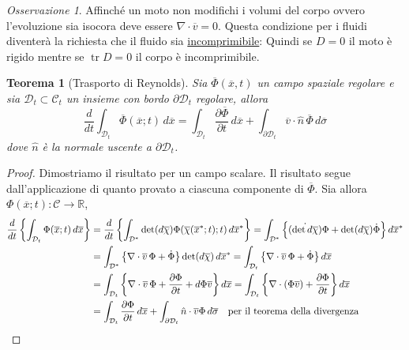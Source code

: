 \documentclass{book}
\theoremstyle{plain}
\newtheorem{teo}{Teorema}[chapter]
\theoremstyle{plain}
\theoremstyle{plain}
\theoremstyle{plain}
\theoremstyle{plain}
\theoremstyle{definition}
\theoremstyle{remark}
\newtheorem*{oss}{Osservazione}
\theoremstyle{definition}
\begin{document}
\begin{oss}
    Affinché un moto non modifichi i volumi del corpo ovvero l'evoluzione sia isocora deve essere $\nabla\cdot\overline{v}=0$. Questa condizione per i fluidi diventerà la richiesta che il fluido sia \underline{incomprimibile}: Quindi se $D=0$ il moto è rigido mentre se $\operatorname{tr}D=0$ il corpo è incomprimibile.
\end{oss}

\begin{teo}[Trasporto di Reynolds]
    Sia $\overline{\Phi}(\overline{x},t)$ un campo spaziale regolare e sia $\mathcal{D}_t\subset\mathcal{C}_t$ un insieme con bordo $\partial\mathcal{D}_t$ regolare, allora
    \begin{displaymath}
        \frac{d}{dt}\int_{\mathcal{D}_t}\overline{\Phi}(\overline{x};t)\,d\overline{x} = \int_{\mathcal{D}_t}\frac{\partial \overline{\Phi}}{\partial t}\,d\overline{x} + \int_{\partial \mathcal{D}_t}\overline{v}\cdot\hat{n}\,\overline{\Phi}\,d\overline{\sigma}
    \end{displaymath}
    dove $\hat{n}$ è la normale uscente a $\partial\mathcal{D}_t$.
\end{teo}

\begin{proof}
    Dimostriamo il risultato per un campo scalare. Il risultato segue dall'applicazione di quanto provato a ciascuna componente di $\overline{\Phi}$. Sia allora $\Phi(\overline{x};t):\mathcal{C}\to\mathbb{R}$,
    \[
    \begin{split}
        \frac{d}{dt}\left\{\int_{\mathcal{D}_t}\Phi(\overline{x};t)\,d\overline{x}\right\}&=\frac{d}{dt}\left\{\int_{\mathcal{D}^*}\det(d\overline{\chi})\Phi(\overline{\chi}(\overline{x}^*;t);t)\,d\overline{x}^*\right\}=\int_{\mathcal{D}^*}\left\{\Dot{(\det d\overline{\chi})}\Phi+\det (d\overline{\chi})\Dot{\Phi}\right\}d\overline{x}^* \\
        &=\int_{\mathcal{D}^*}\left\{\nabla\cdot\overline{v}\,\Phi+\Dot{\Phi}\right\}\det (d\overline{\chi})\,d\overline{x}^*=\int_{\mathcal{D}_t}\left\{\nabla\cdot\overline{v}\,\Phi+\Dot{\Phi}\right\}d\overline{x} \\
        &=\int_{\mathcal{D}_t}\left\{\nabla\cdot\overline{v}\,\Phi+\frac{\partial\Phi}{\partial t}+d\Phi\overline{v}\right\}d\overline{x}=\int_{\mathcal{D}_t}\left\{\nabla\cdot(\Phi\overline{v})+\frac{\partial\Phi}{\partial t}\right\}d\overline{x} \\
        &=\int_{\mathcal{D}_t}\frac{\partial\Phi}{\partial t}\,d\overline{x}+\int_{\partial\mathcal{D}_t}\hat{n}\cdot\overline{v}\Phi\,d\overline{\sigma} \text{\quad per il teorema della divergenza}
    \end{split}
    \]
\end{proof}
\end{document}
